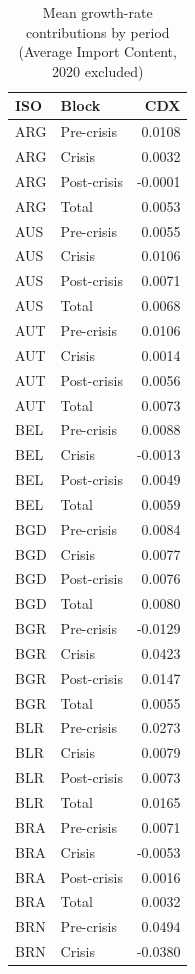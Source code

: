 
\begin{longtable}[t]{llr}
\caption{\label{tab:TAB-PERIOD-MEANS}Mean growth-rate contributions by period (Average Import Content, 2020 excluded)}\\
\toprule
ISO & Block & CDX\\
\midrule
ARG & Pre-crisis & 0.0108\\
ARG & Crisis & 0.0032\\
ARG & Post-crisis & -0.0001\\
ARG & Total & 0.0053\\
AUS & Pre-crisis & 0.0055\\
\addlinespace
AUS & Crisis & 0.0106\\
AUS & Post-crisis & 0.0071\\
AUS & Total & 0.0068\\
AUT & Pre-crisis & 0.0106\\
AUT & Crisis & 0.0014\\
\addlinespace
AUT & Post-crisis & 0.0056\\
AUT & Total & 0.0073\\
BEL & Pre-crisis & 0.0088\\
BEL & Crisis & -0.0013\\
BEL & Post-crisis & 0.0049\\
\addlinespace
BEL & Total & 0.0059\\
BGD & Pre-crisis & 0.0084\\
BGD & Crisis & 0.0077\\
BGD & Post-crisis & 0.0076\\
BGD & Total & 0.0080\\
\addlinespace
BGR & Pre-crisis & -0.0129\\
BGR & Crisis & 0.0423\\
BGR & Post-crisis & 0.0147\\
BGR & Total & 0.0055\\
BLR & Pre-crisis & 0.0273\\
\addlinespace
BLR & Crisis & 0.0079\\
BLR & Post-crisis & 0.0073\\
BLR & Total & 0.0165\\
BRA & Pre-crisis & 0.0071\\
BRA & Crisis & -0.0053\\
\addlinespace
BRA & Post-crisis & 0.0016\\
BRA & Total & 0.0032\\
BRN & Pre-crisis & 0.0494\\
BRN & Crisis & -0.0380\\

\end{longtable}

